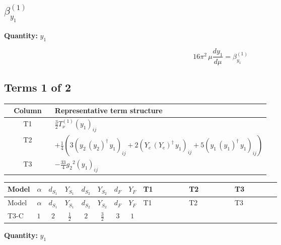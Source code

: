 \documentclass[8pt]{article}
\begin{document}
\begin{landscape}
\section*{$\beta_{y_1}^{(1)}$}
\noindent\textbf{Quantity: }$y_1$\par\smallskip
\[16\pi^2\,\mu\frac{d y_1}{d\mu}=\beta_{y_1}^{(1)}\]
\subsection*{Terms 1 of 2}
\begin{center}
\begin{tabular}{@{}c >{\raggedright\arraybackslash}p{0.82\linewidth}@{}}
\toprule
Column & Representative term structure \\
\midrule
T1 & \(\displaystyle \frac{3}{2} T_{\nu}^{(1)} \left({y_1}\right)_{ij}\) \\
\midrule
T2 & \(\displaystyle +\frac{1}{4} (3 \left({y_2}\,\left({y_2}\right)^{\dagger}\,{y_1}\right)_{ij}+2 \left({Y_e}\,\left({Y_e}\right)^{\dagger}\,{y_1}\right)_{ij}+5 \left({y_1}\,\left({y_1}\right)^{\dagger}\,{y_1}\right)_{ij})\) \\
\midrule
T3 & \(\displaystyle -\frac{33}{4} {g_2}^2 \left({y_1}\right)_{ij}\) \\
\midrule
\bottomrule
\end{tabular}
\end{center}
\smallskip
\tiny
\begin{longtable}{@{}llcccccc >{\raggedright\arraybackslash}p{0.21\linewidth} >{\raggedright\arraybackslash}p{0.21\linewidth} >{\raggedright\arraybackslash}p{0.21\linewidth}@{}}
\toprule
Model & $\alpha$ & $d_{S_1}$ & $Y_{S_1}$ & $d_{S_2}$ & $Y_{S_2}$ & $d_F$ & $Y_F$ & T1 & T2 & T3 \\
\midrule
\endfirsthead
\toprule
Model & $\alpha$ & $d_{S_1}$ & $Y_{S_1}$ & $d_{S_2}$ & $Y_{S_2}$ & $d_F$ & $Y_F$ & T1 & T2 & T3 \\
\midrule
\endhead
T3-C & $1$ & $2$ & $\frac{1}{2}$ & $2$ & $\frac{3}{2}$ & $3$ & $1$ & \scriptsize\adjustbox{max width=\linewidth}{$\begin{gathered} \frac{3}{2} T_{\nu}^{(1)} \left({y_1}\right)_{ij}\end{gathered}$} & \scriptsize\adjustbox{max width=\linewidth}{$\begin{gathered} +\frac{1}{4} (3 \left({y_2}\,\left({y_2}\right)^{\dagger}\,{y_1}\right)_{ij}+2 \left({Y_e}\,\left({Y_e}\right)^{\dagger}\,{y_1}\right)_{ij}+5 \left({y_1}\,\left({y_1}\right)^{\dagger}\,{y_1}\right)_{ij})\end{gathered}$} & \scriptsize\adjustbox{max width=\linewidth}{$\begin{gathered} -\frac{33}{4} {g_2}^2 \left({y_1}\right)_{ij}\end{gathered}$} \\
\midrule
\bottomrule
\end{longtable}
\clearpage
\noindent\textbf{Quantity: }$y_1$\par\smallskip

\end{landscape}
\end{document}
